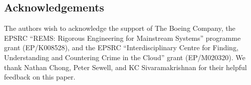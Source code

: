 \documentclass[a4paper,english]{lipics-v2018}
\begin{document}
\subsection*{Acknowledgements}

The authors wish to acknowledge the support of The Boeing Company,
the EPSRC ``REMS: Rigorous Engineering for Mainstream Systems'' programme grant (EP/K008528), and
the EPSRC ``Interdisciplinary Centre for Finding, Understanding and Countering Crime in the Cloud'' grant (EP/M020320).
We thank Nathan Chong, Peter Sewell, and KC Sivaramakrishnan for their helpful feedback on this paper.

\newpage

{}

\newpage
\appendix

\end{document}
